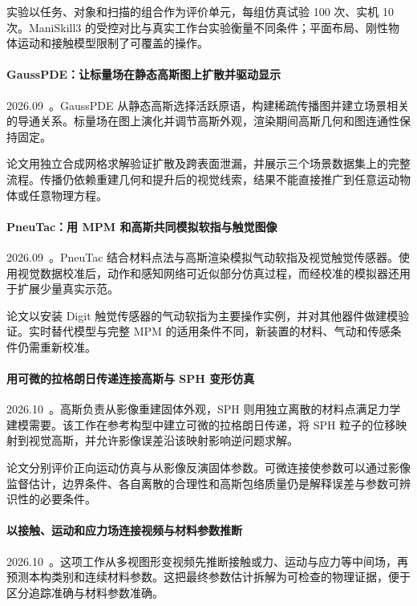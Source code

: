 实验以任务、对象和扫描的组合作为评价单元，每组仿真试验 100 次、实机 10 次。ManiSkill3 的受控对比与真实工作台实验衡量不同条件；平面布局、刚性物体运动和接触模型限制了可覆盖的操作。

\paragraph{GaussPDE：让标量场在静态高斯图上扩散并驱动显示}
2026.09~\cite{2609_27264}。GaussPDE 从静态高斯选择活跃原语，构建稀疏传播图并建立场景相关的导通关系。标量场在图上演化并调节高斯外观，渲染期间高斯几何和图连通性保持固定。

论文用独立合成网格求解验证扩散及跨表面泄漏，并展示三个场景数据集上的完整流程。传播仍依赖重建几何和提升后的视觉线索，结果不能直接推广到任意运动物体或任意物理方程。

\paragraph{PneuTac：用 MPM 和高斯共同模拟软指与触觉图像}
2026.09~\cite{2609_38418}。PneuTac 结合材料点法与高斯渲染模拟气动软指及视觉触觉传感器。使用视觉数据校准后，动作和感知网络可近似部分仿真过程，而经校准的模拟器还用于扩展少量真实示范。

论文以安装 Digit 触觉传感器的气动软指为主要操作实例，并对其他器件做建模验证。实时替代模型与完整 MPM 的适用条件不同，新装置的材料、气动和传感条件仍需重新校准。

\paragraph{用可微的拉格朗日传递连接高斯与 SPH 变形仿真}
2026.10~\cite{2610_04336}。高斯负责从影像重建固体外观，SPH 则用独立离散的材料点满足力学建模需要。该工作在参考构型中建立可微的拉格朗日传递，将 SPH 粒子的位移映射到视觉高斯，并允许影像误差沿该映射影响逆问题求解。

论文分别评价正向运动仿真与从影像反演固体参数。可微连接使参数可以通过影像监督估计，边界条件、各自离散的合理性和高斯包络质量仍是解释误差与参数可辨识性的必要条件。

\paragraph{以接触、运动和应力场连接视频与材料参数推断}
2026.10~\cite{2610_17591}。这项工作从多视图形变视频先推断接触或力、运动与应力等中间场，再预测本构类别和连续材料参数。这把最终参数估计拆解为可检查的物理证据，便于区分追踪准确与材料参数准确。

